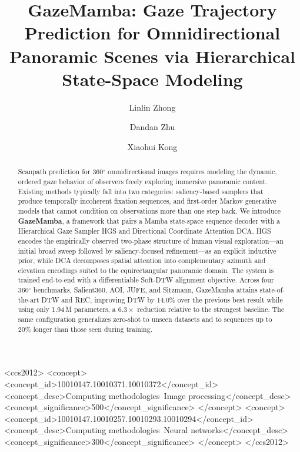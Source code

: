 \documentclass[sigconf]{acmart}
\begin{document}
\title{GazeMamba: Gaze Trajectory Prediction for Omnidirectional Panoramic Scenes via Hierarchical State-Space Modeling}

\author{Linlin Zhong}

\author{Dandan Zhu}

\author{Xiaohui Kong}

\begin{abstract}
Scanpath prediction for 360$^\circ$ omnidirectional images requires modeling the dynamic, ordered gaze behavior of observers freely exploring immersive panoramic content. Existing methods typically fall into two categories: saliency-based samplers that produce temporally incoherent fixation sequences, and first-order Markov generative models that cannot condition on observations more than one step back. We introduce \textbf{GazeMamba}, a framework that pairs a Mamba state-space sequence decoder with a Hierarchical Gaze Sampler HGS and Directional Coordinate Attention DCA. HGS encodes the empirically observed two-phase structure of human visual exploration—an initial broad sweep followed by saliency-focused refinement—as an explicit inductive prior, while DCA decomposes spatial attention into complementary azimuth and elevation encodings suited to the equirectangular panoramic domain. The system is trained end-to-end with a differentiable Soft-DTW alignment objective. Across four 360$^\circ$ benchmarks, Salient360, AOI, JUFE, and Sitzmann, GazeMamba attains state-of-the-art DTW and REC, improving DTW by 14.0\% over the previous best result while using only 1.94\,M parameters, a $6.3\times$ reduction relative to the strongest baseline. The same configuration generalizes zero-shot to unseen datasets and to sequences up to 20\% longer than those seen during training.
\end{abstract}

\begin{CCSXML}
<ccs2012>
   <concept>
       <concept_id>10010147.10010371.10010372</concept_id>
       <concept_desc>Computing methodologies~Image processing</concept_desc>
       <concept_significance>500</concept_significance>
       </concept>
   <concept>
       <concept_id>10010147.10010257.10010293.10010294</concept_id>
       <concept_desc>Computing methodologies~Neural networks</concept_desc>
       <concept_significance>300</concept_significance>
       </concept>
 </ccs2012>
\end{CCSXML}
\end{document}
